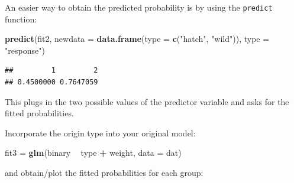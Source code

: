 \documentclass[]{book}
\newenvironment{Shaded}{\begin{snugshade}}{\end{snugshade}}
\newcommand{\KeywordTok}[1]{\textcolor[rgb]{0.13,0.29,0.53}{\textbf{#1}}}
\newcommand{\DataTypeTok}[1]{\textcolor[rgb]{0.13,0.29,0.53}{#1}}
\newcommand{\StringTok}[1]{\textcolor[rgb]{0.31,0.60,0.02}{#1}}
\newcommand{\OperatorTok}[1]{\textcolor[rgb]{0.81,0.36,0.00}{\textbf{#1}}}
\newcommand{\NormalTok}[1]{#1}
\theoremstyle{definition}
\theoremstyle{definition}
\theoremstyle{definition}
\theoremstyle{remark}
\begin{document}
An easier way to obtain the predicted probability is by using the
\texttt{predict} function:

\begin{Shaded}
\begin{Highlighting}[]
\KeywordTok{predict}\NormalTok{(fit2,}
        \DataTypeTok{newdata =} \KeywordTok{data.frame}\NormalTok{(}\DataTypeTok{type =} \KeywordTok{c}\NormalTok{(}\StringTok{"hatch"}\NormalTok{, }\StringTok{"wild"}\NormalTok{)),}
        \DataTypeTok{type =} \StringTok{"response"}\NormalTok{)}
\end{Highlighting}
\end{Shaded}

\begin{verbatim}
##         1         2 
## 0.4500000 0.7647059
\end{verbatim}

This plugs in the two possible values of the predictor variable and asks
for the fitted probabilities.

Incorporate the origin type into your original model:

\begin{Shaded}
\begin{Highlighting}[]
\NormalTok{fit3 =}\StringTok{ }\KeywordTok{glm}\NormalTok{(binary }\OperatorTok{~}\StringTok{ }\NormalTok{type }\OperatorTok{+}\StringTok{ }\NormalTok{weight, }\DataTypeTok{data =}\NormalTok{ dat)}
\end{Highlighting}
\end{Shaded}

and obtain/plot the fitted probabilities for each group:
\end{document}
